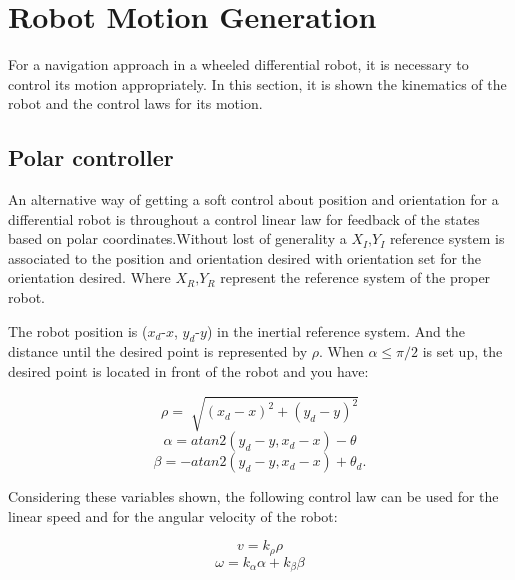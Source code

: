 \documentclass[conference]{IEEEtran}
\begin{document}
\section{Robot Motion Generation}
\label{sec:robot_motion}
For a navigation approach in a wheeled differential robot, it is necessary to control its motion appropriately. In this section, it is shown the kinematics of the robot and the control laws for its motion.

\subsection{Polar controller}


An alternative way of getting a soft control about position and orientation for a differential robot is throughout a control linear law for feedback  of the states based on polar coordinates.Without lost of generality a $\textbf{$X_{I}$,$Y_{I}$}$ reference system is associated to the position and orientation desired with orientation  set for the orientation desired. Where $\textbf{$X_{R}$,$Y_{R}$}$ represent the reference system of the proper robot.

The robot position is ($x_{d}$-$x$, $y_{d}$-$y$) in the inertial reference system. And the distance until the desired point is represented by $\rho$. When $\alpha \leq \pi/2 $ is set up, the desired point is located in front of the robot and you have:

\begin{equation}
	\rho = \sqrt[]{(x_{d} - x)^2 + (y_{d} - y)^2} 
\end{equation}
\begin{equation}
	\alpha = atan2(y_{d} - y, x_{d} - x) - \theta 
\end{equation}
\begin{equation}
	\beta = -atan2(y_{d} - y, x_{d} - x) + \theta_{d}.
\end{equation}

Considering these variables shown, the following control law can be used for the linear speed and for the angular velocity of the robot:

\begin{equation}
	v = k_{\rho}\rho
\end{equation}
\begin{equation}
	\omega = k_{\alpha}\alpha + k_{\beta}\beta
\end{equation}
\end{document}
